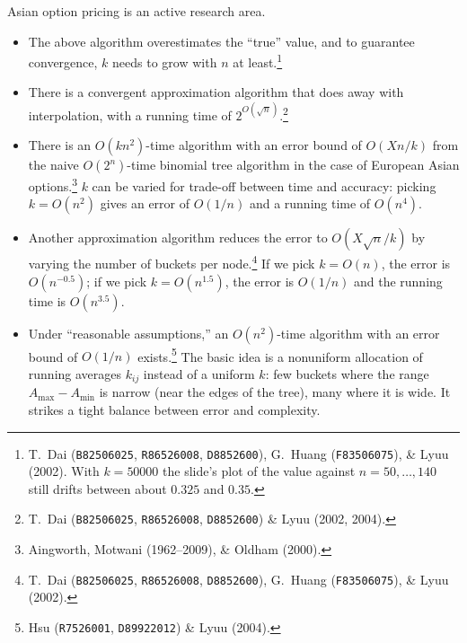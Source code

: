 Asian option pricing is an active research area.
\begin{itemize}[itemsep=0.3em]
	\item The above algorithm overestimates the ``true'' value, and to guarantee convergence, $k$ needs to grow with $n$ at least.\footnote{T.~Dai (\texttt{B82506025}, \texttt{R86526008}, \texttt{D8852600}), G.~Huang (\texttt{F83506075}), \& Lyuu (2002). With $k=50000$ the slide's plot of the value against $n=50,\ldots,140$ still drifts between about $0.325$ and $0.35$.}
	\item There is a convergent approximation algorithm that does away with interpolation, with a running time of $2^{O(\sqrt{n})}$.\footnote{T.~Dai (\texttt{B82506025}, \texttt{R86526008}, \texttt{D8852600}) \& Lyuu (2002, 2004).}
	\item There is an $O(kn^{2})$-time algorithm with an error bound of $O(Xn/k)$ from the naive $O(2^{n})$-time binomial tree algorithm in the case of European Asian options.\footnote{Aingworth, Motwani (1962--2009), \& Oldham (2000).}
	      $k$ can be varied for trade-off between time and accuracy: picking $k=O(n^{2})$ gives an error of $O(1/n)$ and a running time of $O(n^{4})$.
	\item Another approximation algorithm reduces the error to $O(X\sqrt{n}/k)$ by varying the number of buckets per node.\footnote{T.~Dai (\texttt{B82506025}, \texttt{R86526008}, \texttt{D8852600}), G.~Huang (\texttt{F83506075}), \& Lyuu (2002).}
	      If we pick $k=O(n)$, the error is $O(n^{-0.5})$; if we pick $k=O(n^{1.5})$, the error is $O(1/n)$ and the running time is $O(n^{3.5})$.
	\item Under ``reasonable assumptions,'' an $O(n^{2})$-time algorithm with an error bound of $O(1/n)$ exists.\footnote{Hsu (\texttt{R7526001}, \texttt{D89922012}) \& Lyuu (2004).}
	      The basic idea is a nonuniform allocation of running averages $k_{ij}$ instead of a uniform $k$: few buckets where the range $A_{\max}-A_{\min}$ is narrow (near the edges of the tree), many where it is wide.
	      It strikes a tight balance between error and complexity.
\end{itemize}

\suppstart
{}

